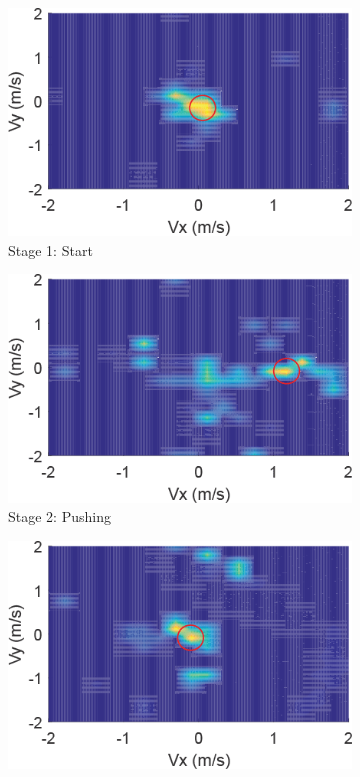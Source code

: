 \begin{figure}[t]
	\centering
	\begin{subfigure}{0.22\textwidth}
		\centering
		\includegraphics[width=\textwidth]{figures/bvp_stage_1_start}
		\caption{Stage 1: Start}
	\end{subfigure}
	\hfill
	\begin{subfigure}{0.22\textwidth}
		\centering
		\includegraphics[width=\textwidth]{figures/bvp_stage_2_pushing}
		\caption{Stage 2: Pushing}
	\end{subfigure}
	\hfill
	\begin{subfigure}{0.22\textwidth}
		\centering
		\includegraphics[width=\textwidth]{figures/bvp_stage_3_stop}

\end{subfigure}
\end{figure}

